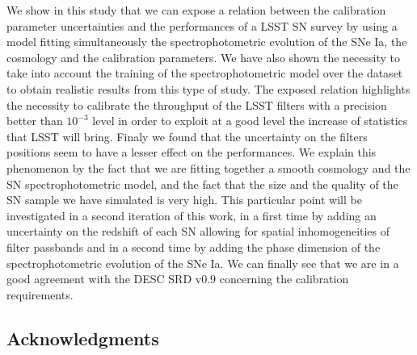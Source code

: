 \documentclass[\docopts]{\docclass}
\begin{document}
We show in this study that we can expose a relation between the
calibration parameter uncertainties and the performances of a LSST SN
survey by using a model fitting simultaneously the spectrophotometric
evolution of the SNe Ia, the cosmology and the calibration parameters.
We have also shown the necessity to take into account the training of
the spectrophotometric model over the dataset to obtain realistic
results from this type of study.  The exposed relation highlights the
necessity to calibrate the throughput of the LSST filters with a
precision better than $10^{-3}$ level in order to exploit at a good
level the increase of statistics that LSST will bring.  Finaly we
found that the uncertainty on the filters positions seem to have a
lesser effect on the performances.  We explain this phenomenon by the
fact that we are fitting together a smooth cosmology and the SN
spectrophotometric model, and the fact that the size and the quality
of the SN sample we have simulated is very high.  This particular
point will be investigated in a second iteration of this work, in a
first time by adding an uncertainty on the redshift of each SN
allowing for spatial inhomogeneities of filter passbands and in a
second time by adding the phase dimension of the spectrophotometric
evolution of the SNe Ia. We can finally see that we are in a good
agreement with the DESC SRD v0.9 concerning the calibration
requirements.



\subsection*{Acknowledgments}


%





\end{document}
